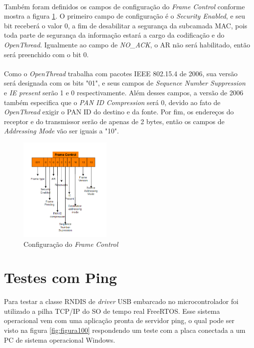 \paragraph{} Também foram definidos os campos de configuração do \textit{Frame Control} conforme mostra a figura \ref{fig:figura99}. O primeiro campo de configuração é o \textit{Security Enabled}, e seu bit receberá o valor 0, a fim de desabilitar a segurança da subcamada MAC, pois toda parte de segurança da informação estará a cargo da codificação e do \textit{OpenThread}. Igualmente ao campo de \textit{NO\_ACK}, o AR não será habilitado, então será preenchido com o bit 0. 

\paragraph{} Como o \textit{OpenThread} trabalha com pacotes IEEE 802.15.4 de 2006, sua versão será designada com os bits "01", e seus campos de \textit{Sequence Number Suppression} e \textit{IE present} serão 1 e 0 respectivamente. Além desses campos, a versão de 2006 também especifica que o \textit{PAN ID Compression} será 0, devido ao fato de \textit{OpenThread} exigir o PAN ID do destino e da fonte. Por fim, os endereços do receptor e do transmissor serão de apenas de 2 bytes, então os campos de \textit{Addressing Mode} vão ser iguais a "10".

\begin{figure}[!ht]
	\centering
	\includegraphics[width=0.4\textwidth]{Figuras/MHR.PNG}   
	\caption{Configuração do \textit{Frame Control}}
	\label{fig:figura99}
\end{figure}


\section{Testes com Ping}
\paragraph{} Para testar a classe RNDIS de \textit{driver} USB embarcado no microcontrolador foi utilizado a pilha TCP/IP do SO de tempo real FreeRTOS. Esse sistema operacional vem com uma aplicação pronta de servidor ping, o qual pode ser visto na figura \ref{fig:figura100} respondendo um teste com a placa conectada a um PC de sistema operacional Windows. 

